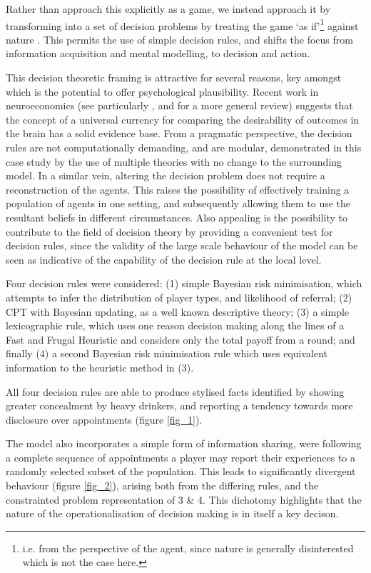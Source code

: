 \documentclass[twocolumn]{article}
\begin{document}
Rather than approach this explicitly as a game, we instead approach it by transforming into a set of decision problems by treating the game `as if'\footnote{i.e. from the perspective of the agent, since nature is generally disinterested which is not the case here.} against nature \citep{RiosInsua2009}. This permits the use of simple decision rules, and shifts the focus from information acquisition and mental modelling, to decision and action. 

This decision theoretic framing is attractive for several reasons, key amongst which is the potential to offer psychological plausibility. Recent work in neuroeconomics (see particularly \citep{Padoa-Schioppa2006}, and \citep{Rustichini2009} for a more general review) suggests that the concept of a universal currency for comparing the desirability of outcomes in the brain has a solid evidence base.  
From a pragmatic perspective, the decision rules are not computationally demanding, and are modular, demonstrated in this case study by the use of multiple theories with no change to the surrounding model.  In a similar vein, altering the decision problem does not require a reconstruction of the agents. This raises the possibility of effectively training a population of agents in one setting, and subsequently allowing them to use the resultant beliefs in different circumstances. Also appealing is the possibility to contribute to the field of decision theory by providing a convenient test for decision rules, since the validity of the large scale behaviour of the model can be seen as indicative of the capability of the decision rule at the local level.

Four decision rules were considered: (1) simple Bayesian risk minimisation, which attempts to infer the distribution of player types, and likelihood of referral; (2) \ac{CPT} \citep{Tversky1992} with Bayesian updating, as a well known descriptive theory; (3) a simple lexicographic rule, which uses one reason decision making along the lines of a Fast and Frugal Heuristic \citep{Gigerenzer1996} and considers only the total payoff from a round; and finally (4) a second Bayesian risk minimisation rule which uses equivalent information to the heuristic method in (3).

All four decision rules are able to produce stylised facts identified by \citep{Alvik2006} showing greater concealment by heavy drinkers, and \citep{Phillips2007} reporting a tendency towards more disclosure over appointments (figure \ref{fig_1}). 

The model also incorporates a simple form of information sharing, were following a complete sequence of appointments a player may report their experiences to a randomly selected subset of the population. This leads to significantly divergent behaviour (figure \ref{fig_2}), arising both from the differing rules, and the constrainted problem representation of 3 \& 4. This dichotomy highlights that the nature of the operationalisation of decision making is in itself a key decison.
\end{document}
